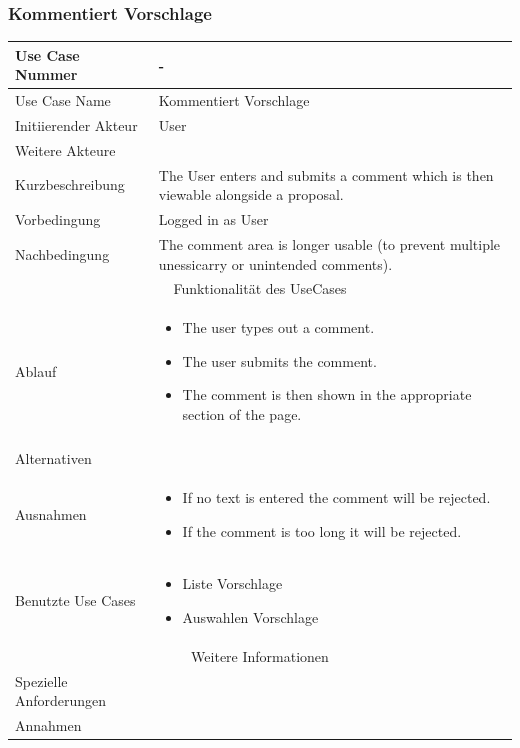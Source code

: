 \documentclass[10pt,a4paper]{article}
\begin{document}
	\subsubsection{Kommentiert Vorschlage}
	\begin{tabular}{|l|p{.5\linewidth}|}
	\hline Use Case Nummer & - \\ 
	\hline Use Case Name & Kommentiert Vorschlage \\ 
	\hline Initiierender Akteur & User \\
	\hline Weitere Akteure & \\
	\hline Kurzbeschreibung & The User enters and submits a comment which is then viewable alongside a proposal. \\
	\hline Vorbedingung & Logged in as User \\
	\hline Nachbedingung & The comment area is longer usable (to prevent multiple unessicarry or unintended comments). \\
	\hline \multicolumn{2}{|c|}{Funktionalität des UseCases}\\
	\hline Ablauf & \begin{itemize}
			\item The user types out a comment.
			\item The user submits the comment.
			\item The comment is then shown in the appropriate section of the page.
		\end{itemize} \\ \\
	\hline Alternativen &  \\
	\hline Ausnahmen & \begin{itemize}
			\item If no text is entered the comment will be rejected.
			\item If the comment is too long it will be rejected.
		\end{itemize} \\
	\hline Benutzte Use Cases & \begin{itemize}
			\item Liste Vorschlage
			\item Auswahlen Vorschlage
		\end{itemize} \\
	\hline \multicolumn{2}{|c|}{Weitere Informationen} \\
	\hline Spezielle Anforderungen &  \\
	\hline Annahmen &  \\
	\hline
	\end{tabular}
	
\end{document}
